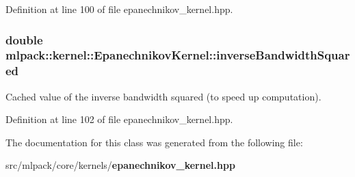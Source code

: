 Definition at line 100 of file epanechnikov\+\_\+kernel.\+hpp.

\subsubsection[{inverse\+Bandwidth\+Squared}]{\setlength{\rightskip}{0pt plus 5cm}double mlpack\+::kernel\+::\+Epanechnikov\+Kernel\+::inverse\+Bandwidth\+Squared\hspace{0.3cm}{\ttfamily [private]}}\label{classmlpack_1_1kernel_1_1EpanechnikovKernel_a600e630485fae4c895fa29eb55445731}


Cached value of the inverse bandwidth squared (to speed up computation). 



Definition at line 102 of file epanechnikov\+\_\+kernel.\+hpp.



The documentation for this class was generated from the following file\+:\begin{DoxyCompactItemize}
\item 
src/mlpack/core/kernels/{\bf epanechnikov\+\_\+kernel.\+hpp}\end{DoxyCompactItemize}
